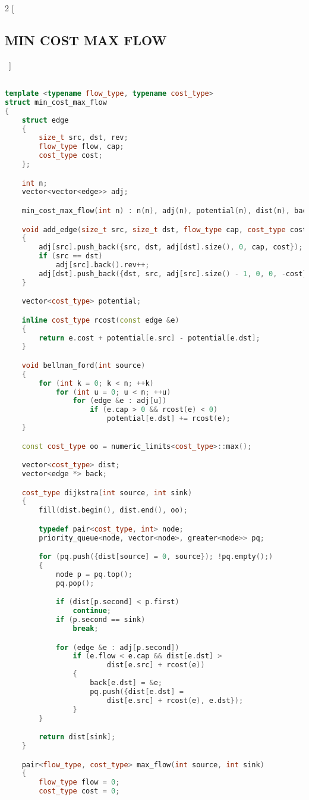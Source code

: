 \documentclass[leter]{amsart}
\begin{document}
\begin{multicols}{2}
[\subsection{MIN COST MAX FLOW}\ ]
\begin{lstlisting}[language=C++]

template <typename flow_type, typename cost_type>
struct min_cost_max_flow
{
	struct edge
	{
		size_t src, dst, rev;
		flow_type flow, cap;
		cost_type cost;
	};

	int n;
	vector<vector<edge>> adj;

	min_cost_max_flow(int n) : n(n), adj(n), potential(n), dist(n), back(n) {}

	void add_edge(size_t src, size_t dst, flow_type cap, cost_type cost)
	{
		adj[src].push_back({src, dst, adj[dst].size(), 0, cap, cost});
		if (src == dst)
			adj[src].back().rev++;
		adj[dst].push_back({dst, src, adj[src].size() - 1, 0, 0, -cost});
	}

	vector<cost_type> potential;

	inline cost_type rcost(const edge &e)
	{
		return e.cost + potential[e.src] - potential[e.dst];
	}

	void bellman_ford(int source)
	{
		for (int k = 0; k < n; ++k)
			for (int u = 0; u < n; ++u)
				for (edge &e : adj[u])
					if (e.cap > 0 && rcost(e) < 0)
						potential[e.dst] += rcost(e);
	}

	const cost_type oo = numeric_limits<cost_type>::max();

	vector<cost_type> dist;
	vector<edge *> back;

	cost_type dijkstra(int source, int sink)
	{
		fill(dist.begin(), dist.end(), oo);

		typedef pair<cost_type, int> node;
		priority_queue<node, vector<node>, greater<node>> pq;

		for (pq.push({dist[source] = 0, source}); !pq.empty();)
		{
			node p = pq.top();
			pq.pop();

			if (dist[p.second] < p.first)
				continue;
			if (p.second == sink)
				break;

			for (edge &e : adj[p.second])
				if (e.flow < e.cap && dist[e.dst] >
						dist[e.src] + rcost(e))
				{
					back[e.dst] = &e;
					pq.push({dist[e.dst] =
						dist[e.src] + rcost(e), e.dst});
				}
		}

		return dist[sink];
	}

	pair<flow_type, cost_type> max_flow(int source, int sink)
	{
		flow_type flow = 0;
		cost_type cost = 0;


\end{lstlisting}
\end{multicols}
\end{document}
